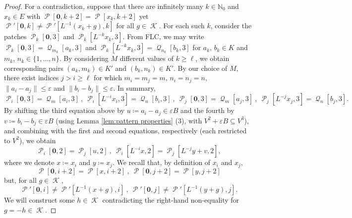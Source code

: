 \documentclass[10pt,a4paper]{amsart}
\newcommand{\N}{\mathbb N}
\DeclareMathOperator{\cK}{\mathcal{K}}
\DeclareMathOperator{\cP}{\mathcal{P}}
\DeclareMathOperator{\cQ}{\mathcal{Q}}
\renewcommand{\epsilon}{\varepsilon}
\begin{document}
\begin{proof}
For a contradiction, suppose that there are infinitely many \(k \in \N_0\) and \(x_k \in E\) with \(\cP[\mathbf{0},k+2] = \cP[x_k,k+2]\) yet \(\cP'[\mathbf{0},k] \neq \cP'[L^{-1}(x_k + g),k]\) for all \(g \in \cK\). For each such \(k\), consider the patches \(\cP_k[\mathbf{0},3]\) and \(\cP_k[L^{-k}x_k,3]\). From FLC, we may write \(\cP_k[\mathbf{0},3] = \cQ_{m_k}[a_k,3]\) and \(\cP_k[L^{-k} x_k,3] = \cQ_{n_k}[b_k,3]\) for \(a_k\), \(b_k \in K\) and \(m_k\), \(n_k \in \{1,\ldots,n\}\). By considering \(M\) different values of \(k \geq \ell\), we obtain corresponding pairs \((a_k,m_k) \in K'\) and \((b_k,n_k) \in K'\). By our choice of \(M\), there exist indices \(j > i \geq \ell\) for which \(m_i = m_j = m\), \(n_i = n_j = n\), \(\|a_i - a_j\| \leq \epsilon\) and \(\|b_i - b_j\| \leq \epsilon\). In summary,
\[
\cP_i[\mathbf{0},3] = \cQ_m[a_i,3]\ , \ \cP_i[L^{-i} x_i,3] = \cQ_n[b_i,3]\ , \ \cP_j[\mathbf{0},3] = \cQ_m[a_j,3]\ , \ \cP_j[L^{-j} x_j,3] = \cQ_n[b_j,3].
\]
By shifting the third equation above by \(u \coloneqq a_i - a_j \in \epsilon B\) and the fourth by \(v \coloneqq b_i - b_j \in \epsilon B\) (using Lemma \ref{lem:pattern properties} (3), with \(V^2 + \epsilon B \subseteq V^3\)), and combining with the first and second equations, respectively (each restricted to \(V^2\)), we obtain
\begin{equation}\label{eq:UC1}
\cP_i[\mathbf{0},2] = \cP_j[u,2]\ , \ \cP_i[L^{-i}x,2] = \cP_j[L^{-j}y + v,2] ,
\end{equation}
where we denote \(x \coloneqq x_i\) and \(y \coloneqq x_j\). We recall that, by definition of \(x_i\) and \(x_j\),
\begin{equation}\label{eq:UC2}
\cP[\mathbf{0},i+2] = \cP[x,i+2]\ , \ \cP[\mathbf{0},j+2] = \cP[y,j+2]
\end{equation}
but, for all \(g \in \cK\),
\begin{equation}\label{eq:UC3}
\cP'[\mathbf{0},i] \neq \cP'[L^{-1}(x+g),i]\ , \ \cP'[\mathbf{0},j] \neq \cP'[L^{-1}(y+g),j] .
\end{equation}
We will construct some \(h \in \cK\) contradicting the right-hand non-equality for \(g=-h \in \cK\).


\end{proof}
\end{document}
